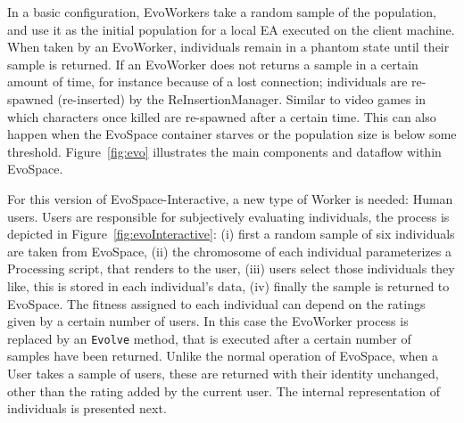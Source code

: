 \documentclass{sig-alternate}
\begin{document}
In a basic configuration, EvoWorkers take a random sample of the
population, and use it as the initial population for a local EA
executed on the client machine. When taken by an EvoWorker,
individuals  remain in a phantom state until their sample is
returned. If an EvoWorker does not returns a sample in a certain
amount of time, for instance because of a lost connection; individuals
are re-spawned (re-inserted) by the ReInsertionManager. Similar to
video games in which characters once killed are re-spawned after a
certain time. This can also happen when the EvoSpace container starves
or the population size is below some threshold. Figure~\ref{fig:evo}
illustrates the main components and dataflow within EvoSpace. %

For this version of EvoSpace-Interactive, a new type of Worker is needed: Human users. Users are responsible for subjectively evaluating individuals, the process is depicted in Figure~\ref{fig:evoInteractive}: (i) first a random sample of six individuals are taken from EvoSpace, (ii) the chromosome of each individual parameterizes a Processing script, that renders to the user, (iii) users select those individuals they like, this is stored in each individual's data, (iv) finally the sample is returned to EvoSpace. The fitness assigned to each individual can depend on the ratings given by a certain number of users. In this case the EvoWorker process is replaced  by an \texttt{Evolve} method, that is executed after a certain number of samples have been returned. 
Unlike the normal operation of EvoSpace, when a User takes a sample of users, these are returned with their identity unchanged, other than the rating added by the current user. The internal representation of individuals is presented next.
\end{document}
